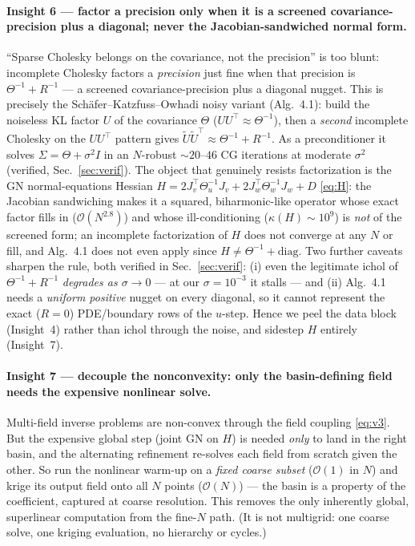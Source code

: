 \documentclass[11pt]{article}
\newcommand{\T}{^{\!\top}}
\newcommand{\inv}{^{-1}}
\newcommand{\Th}{\Theta}
\newcommand{\bigO}{\mathcal{O}}
\begin{document}
\paragraph{Insight 6 --- factor a precision only when it is a screened
covariance-precision plus a diagonal; never the Jacobian-sandwiched normal form.}
``Sparse Cholesky belongs on the covariance, not the precision'' is too blunt:
incomplete Cholesky factors a \emph{precision} just fine when that precision is
$\Th\inv+R\inv$ --- a screened covariance-precision plus a diagonal nugget. This
is precisely the Schäfer--Katzfuss--Owhadi noisy variant (Alg.~4.1): build the
noiseless KL factor $U$ of the covariance $\Th$ ($UU\T\approx\Th\inv$), then a
\emph{second} incomplete Cholesky on the $UU\T$ pattern gives
$\tilde U\tilde U\T\approx\Th\inv+R\inv$. As a preconditioner it solves
$\Sigma=\Th+\sigma^2 I$ in an $N$-robust $\sim\!20$--$46$ CG iterations at
moderate $\sigma^2$ (verified, Sec.~\ref{sec:verif}). The object that genuinely
resists factorization is the GN normal-equations Hessian
$H=2J_v\T\Th_u\inv J_v+2J_w\T\Th_w\inv J_w+D$ \eqref{eq:H}: the Jacobian
sandwiching makes it a squared, biharmonic-like operator whose exact factor fills
in ($\bigO(N^{2.8})$) and whose ill-conditioning ($\kappa(H)\sim10^{9}$) is
\emph{not} of the screened form; an incomplete factorization of $H$ does not
converge at any $N$ or fill, and Alg.~4.1 does not even apply since
$H\ne\Th\inv+\mathrm{diag}$. Two further caveats sharpen the rule, both
verified in Sec.~\ref{sec:verif}: (i) even the legitimate ichol of
$\Th\inv+R\inv$ \emph{degrades as $\sigma\to0$} --- at our $\sigma=10^{-3}$ it
stalls --- and (ii) Alg.~4.1 needs a \emph{uniform positive} nugget on every
diagonal, so it cannot represent the exact ($R=0$) PDE/boundary rows of the
$u$-step. Hence we peel the data block (Insight~4) rather than ichol through the
noise, and sidestep $H$ entirely (Insight~7).

\paragraph{Insight 7 --- decouple the nonconvexity: only the basin-defining field
needs the expensive nonlinear solve.} Multi-field inverse problems are non-convex
through the field coupling \eqref{eq:v3}. But the expensive global step (joint GN
on $H$) is needed \emph{only} to land in the right basin, and the alternating
refinement re-solves each field from scratch given the other. So run the
nonlinear warm-up on a \emph{fixed coarse subset} ($\bigO(1)$ in $N$) and krige
its output field onto all $N$ points ($\bigO(N)$) --- the basin is a property of
the coefficient, captured at coarse resolution. This removes the only inherently
global, superlinear computation from the fine-$N$ path. (It is not multigrid: one
coarse solve, one kriging evaluation, no hierarchy or cycles.)
\end{document}
